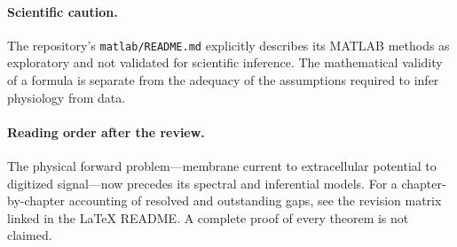 \paragraph{Scientific caution.}
The repository's \texttt{matlab/README.md} explicitly describes its
MATLAB methods as exploratory and not validated for scientific inference.
The mathematical validity of a formula is separate from the adequacy
of the assumptions required to infer physiology from data.

\paragraph{Reading order after the review.}
The physical forward problem---membrane current to extracellular potential
to digitized signal---now precedes its spectral and inferential models.
For a chapter-by-chapter accounting of resolved and outstanding gaps,
see the revision matrix linked in the LaTeX README.
A complete proof of every theorem is not claimed.
